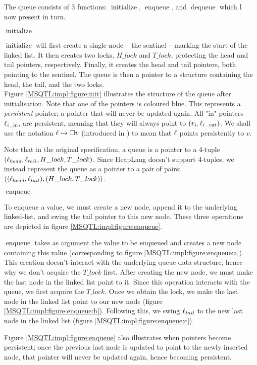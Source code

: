 \documentclass[twoside,11pt,openright]{report}
\newcommand{\initialise}{\operatorname{initialize}}
\newcommand{\enqueue}{\operatorname{enqueue}}
\newcommand{\dequeue}{\operatorname{dequeue}}
\newcommand{\locin}[1]{\loc_{#1\_\text{in}}}
\newcommand{\locout}[1]{\loc_{#1\_\text{out}}}
\begin{document}
The queue consists of 3 functions: $\initialise$, $\enqueue$, and $\dequeue$ which I now present in turn.

$\initialise$

$\initialise$ will first create a single node -- the sentinel -- marking the start of the linked list. It then creates two locks, $H\_lock$ and $T\_lock$, protecting the head and tail pointers, respectively. Finally, it creates the head and tail pointers, both pointing to the sentinel. The queue is then a pointer to a structure containing the head, the tail, and the two locks.\\
Figure \ref{MSQTL:impl:figure:init} illustrates the structure of the queue after initialisation. Note that one of the pointers is coloured blue. This represents a \emph{persistent} pointer; a pointer that will never be updated again. All "in" pointers $\locin{i}$, are persistent, meaning that they will always point to $(v_i, \locout{i})$. We shall use the notation $\ell \mapsto \square v$ (introduced in \cite{DBLP:conf/cpp/VindumB21}) to mean that $\ell$ points persistently to $v$.

Note that in the original specification, a queue is a pointer to a 4-tuple $(\ell_{head}, \ell_{tail}, H\_lock, T\_lock)$. Since HeapLang doesn't support 4-tuples, we instead represent the queue as a pointer to a pair of pairs: $((\ell_{head}, \ell_{tail}), (H\_lock, T\_lock))$.


$\enqueue$

To enqueue a value, we must create a new node, append it to the underlying linked-list, and swing the tail pointer to this new node. These three operations are depicted in figure \ref{MSQTL:impl:figure:enqueue}.

$\enqueue$ takes as argument the value to be enqueued and creates a new node containing this value (corresponding to figure \ref{MSQTL:impl:figure:enqueue:a}). This creation doesn't interact with the underlying queue data-structure, hence why we don't acquire the $T\_lock$ first. After creating the new node, we must make the last node in the linked list point to it. Since this operation interacts with the queue, we first acquire the $T\_lock$. Once we obtain the lock, we make the last node in the linked list point to our new node (figure \ref{MSQTL:impl:figure:enqueue:b}). Following this, we swing $\ell_{tail}$ to the new last node in the linked list (figure \ref{MSQTL:impl:figure:enqueue:c}).

Figure \ref{MSQTL:impl:figure:enqueue} also illustrates when pointers become persistent; once the previous last node is updated to point to the newly inserted node, that pointer will never be updated again, hence becoming persistent.
\end{document}

